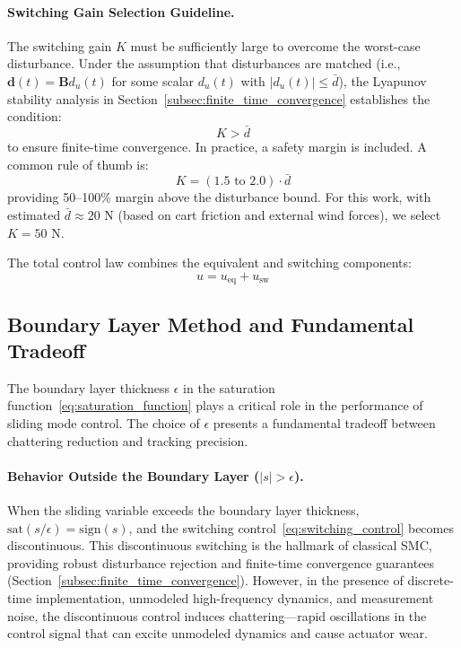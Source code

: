 \paragraph{Switching Gain Selection Guideline.}
The switching gain $K$ must be sufficiently large to overcome the worst-case disturbance. Under the assumption that disturbances are matched (i.e., $\mathbf{d}(t) = \mathbf{B} d_u(t)$ for some scalar $d_u(t)$ with $|d_u(t)| \leq \bar{d}$), the Lyapunov stability analysis in Section~\ref{subsec:finite_time_convergence} establishes the condition:
\begin{equation}
\label{eq:switching_gain_condition}
K > \bar{d}
\end{equation}
to ensure finite-time convergence. In practice, a safety margin is included. A common rule of thumb is:
\begin{equation}
\label{eq:switching_gain_guideline}
K = (1.5 \text{ to } 2.0) \cdot \bar{d}
\end{equation}
providing 50--100\% margin above the disturbance bound. For this work, with estimated $\bar{d} \approx 20$ N (based on cart friction and external wind forces), we select $K = 50$ N.

The total control law combines the equivalent and switching components:
\begin{equation}
\label{eq:total_control_law}
u = u_{\text{eq}} + u_{\text{sw}}
\end{equation}

\subsection{Boundary Layer Method and Fundamental Tradeoff}
\label{subsec:boundary_layer_tradeoff}

The boundary layer thickness $\epsilon$ in the saturation function~\eqref{eq:saturation_function} plays a critical role in the performance of sliding mode control. The choice of $\epsilon$ presents a fundamental tradeoff between chattering reduction and tracking precision.

\paragraph{Behavior Outside the Boundary Layer ($|s| > \epsilon$).}
When the sliding variable exceeds the boundary layer thickness, $\text{sat}(s/\epsilon) = \text{sign}(s)$, and the switching control~\eqref{eq:switching_control} becomes discontinuous. This discontinuous switching is the hallmark of classical SMC, providing robust disturbance rejection and finite-time convergence guarantees (Section~\ref{subsec:finite_time_convergence}). However, in the presence of discrete-time implementation, unmodeled high-frequency dynamics, and measurement noise, the discontinuous control induces chattering---rapid oscillations in the control signal that can excite unmodeled dynamics and cause actuator wear.

